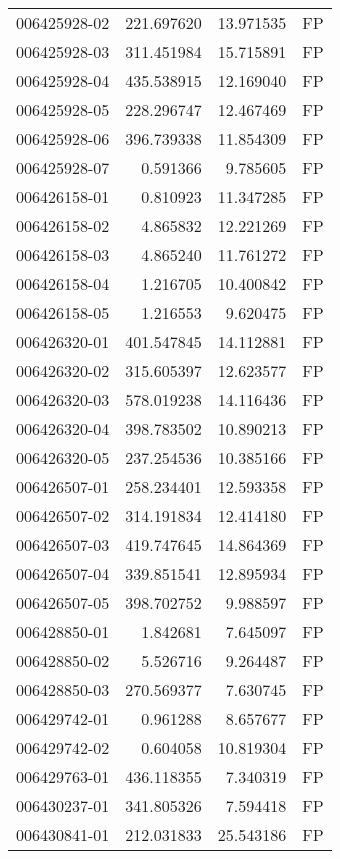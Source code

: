 \begin{tabular}{lrrl}
006425928-02 &  221.697620 &    13.971535 &   FP \\
006425928-03 &  311.451984 &    15.715891 &   FP \\
006425928-04 &  435.538915 &    12.169040 &   FP \\
006425928-05 &  228.296747 &    12.467469 &   FP \\
006425928-06 &  396.739338 &    11.854309 &   FP \\
006425928-07 &    0.591366 &     9.785605 &   FP \\
006426158-01 &    0.810923 &    11.347285 &   FP \\
006426158-02 &    4.865832 &    12.221269 &   FP \\
006426158-03 &    4.865240 &    11.761272 &   FP \\
006426158-04 &    1.216705 &    10.400842 &   FP \\
006426158-05 &    1.216553 &     9.620475 &   FP \\
006426320-01 &  401.547845 &    14.112881 &   FP \\
006426320-02 &  315.605397 &    12.623577 &   FP \\
006426320-03 &  578.019238 &    14.116436 &   FP \\
006426320-04 &  398.783502 &    10.890213 &   FP \\
006426320-05 &  237.254536 &    10.385166 &   FP \\
006426507-01 &  258.234401 &    12.593358 &   FP \\
006426507-02 &  314.191834 &    12.414180 &   FP \\
006426507-03 &  419.747645 &    14.864369 &   FP \\
006426507-04 &  339.851541 &    12.895934 &   FP \\
006426507-05 &  398.702752 &     9.988597 &   FP \\
006428850-01 &    1.842681 &     7.645097 &   FP \\
006428850-02 &    5.526716 &     9.264487 &   FP \\
006428850-03 &  270.569377 &     7.630745 &   FP \\
006429742-01 &    0.961288 &     8.657677 &   FP \\
006429742-02 &    0.604058 &    10.819304 &   FP \\
006429763-01 &  436.118355 &     7.340319 &   FP \\
006430237-01 &  341.805326 &     7.594418 &   FP \\
006430841-01 &  212.031833 &    25.543186 &   FP \\

\end{tabular}
